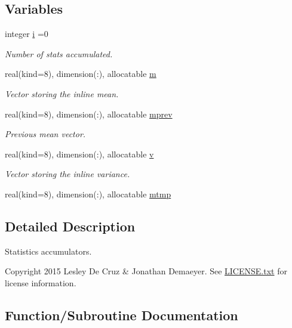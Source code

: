 \subsection*{Variables}
\begin{DoxyCompactItemize}
\item 
integer \hyperlink{namespacestat_aae82ae81e5eb5620583fec6c93aa6fa3}{i} =0
\begin{DoxyCompactList}\small\item\em Number of stats accumulated. \end{DoxyCompactList}\item 
real(kind=8), dimension(\+:), allocatable \hyperlink{namespacestat_a2416f75ad24ac05a0ba615f9c8d467db}{m}
\begin{DoxyCompactList}\small\item\em Vector storing the inline mean. \end{DoxyCompactList}\item 
real(kind=8), dimension(\+:), allocatable \hyperlink{namespacestat_adcf5178f8d91cdc53ff5f28cc3e04689}{mprev}
\begin{DoxyCompactList}\small\item\em Previous mean vector. \end{DoxyCompactList}\item 
real(kind=8), dimension(\+:), allocatable \hyperlink{namespacestat_ab2a3ce8c90189fdbd6bb313c75876473}{v}
\begin{DoxyCompactList}\small\item\em Vector storing the inline variance. \end{DoxyCompactList}\item 
real(kind=8), dimension(\+:), allocatable \hyperlink{namespacestat_a24c9afb1c1c6692185b509fd364508c8}{mtmp}
\end{DoxyCompactItemize}


\subsection{Detailed Description}
Statistics accumulators. 

\begin{DoxyCopyright}{Copyright}
2015 Lesley De Cruz \& Jonathan Demaeyer. See \hyperlink{LICENSE_8txt}{L\+I\+C\+E\+N\+S\+E.\+txt} for license information. 
\end{DoxyCopyright}


\subsection{Function/\+Subroutine Documentation}
